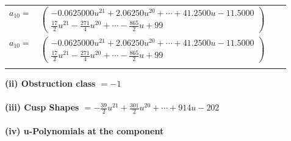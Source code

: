 \documentclass[1p]{elsarticle_modified}
\theoremstyle{definition}
\begin{document}
\begin{tabular}{m{7pt} m{180pt} m{7pt} m{180pt} }
\flushright $a_{10}=$&$\begin{pmatrix}-0.0625000 u^{21}+2.06250 u^{20}+\cdots+41.2500 u-11.5000\\\frac{17}{2} u^{21}-\frac{271}{4} u^{20}+\cdots-\frac{865}{2} u+99\end{pmatrix}$\\ \flushright $a_{10}=$&$\begin{pmatrix}-0.0625000 u^{21}+2.06250 u^{20}+\cdots+41.2500 u-11.5000\\\frac{17}{2} u^{21}-\frac{271}{4} u^{20}+\cdots-\frac{865}{2} u+99\end{pmatrix}$\\&\end{tabular}
\flushleft \textbf{(ii) Obstruction class $= -1$}\\~\\
\flushleft \textbf{(iii) Cusp Shapes $= -\frac{39}{2} u^{21}+\frac{301}{2} u^{20}+\cdots+914 u-202$}\\~\\
\newpage\renewcommand{\arraystretch}{1}
\flushleft \textbf{(iv) u-Polynomials at the component}\newline \\
\end{document}
